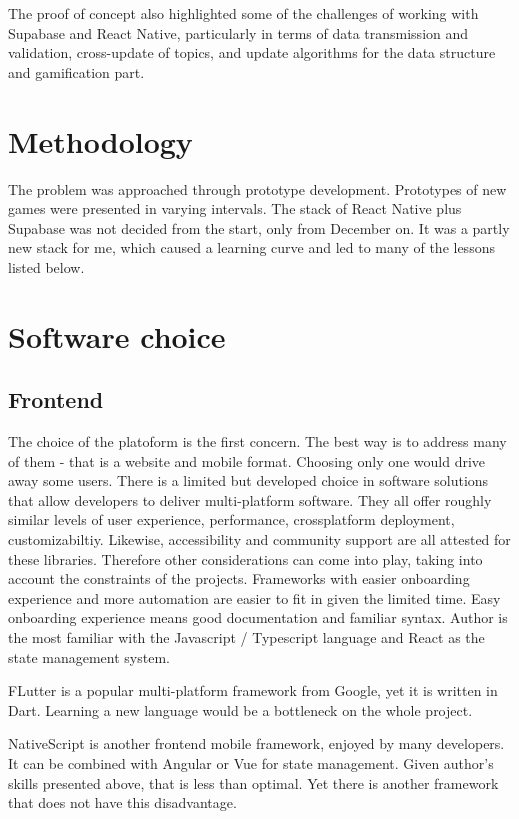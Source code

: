 \documentclass{report}
\begin{document}
{The proof of concept also highlighted some of the challenges of working with Supabase and React Native, particularly in terms of data transmission and validation, cross-update of topics, and update algorithms for the data structure and gamification part.

\section{Methodology}
The problem was approached through prototype development. Prototypes of new games were presented in varying intervals. The stack of React Native plus Supabase was not decided from the start, only from December on. It was a partly new stack for me, which caused a learning curve and led to many of the lessons listed below.

\section{Software choice}

\subsection{Frontend}
The choice of the platoform is the first concern. The best way is to address many of them - that is a website and mobile format. Choosing only one would drive away some users. 
There is a limited but developed choice in software solutions that allow developers to deliver multi-platform software. They all offer roughly similar levels of user experience, performance, crossplatform deployment, customizabiltiy. Likewise, accessibility and community support are all attested for these libraries.
Therefore other considerations can come into play, taking into account the constraints of the projects. Frameworks with easier onboarding experience and more automation are easier to fit in given the limited time. Easy onboarding experience means good documentation and familiar syntax.
Author is the most familiar with the Javascript / Typescript language and React as the state management system.

FLutter is a popular multi-platform framework from Google, yet it is written in Dart. Learning a new language would be a bottleneck on the whole project.
\cite{noauthor_flutter_nodate}

NativeScript is another frontend mobile framework, enjoyed by many developers. It can be combined with Angular or Vue for state management.
\cite{noauthor_nativescript_nodate}
Given author's skills presented above, that is less than optimal. Yet there is another framework that does not have this disadvantage.

}
\end{document}
